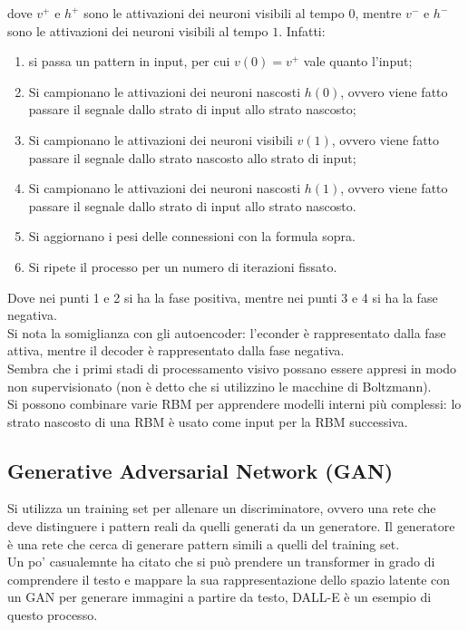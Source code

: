 dove $v^{+}$ e $h^{+}$ sono le attivazioni dei neuroni visibili al tempo $0$,
mentre $v^{-}$ e $h^{-}$ sono le attivazioni dei neuroni visibili al tempo
$1$. Infatti:
\begin{enumerate}
	\item si passa un pattern in input, per cui $v(0) = v^{+}$ vale quanto
		l'input; 

	\item Si campionano le attivazioni dei neuroni nascosti $h(0)$, ovvero viene
	fatto passare il segnale dallo strato di input allo strato nascosto;

	\item Si campionano le attivazioni dei neuroni visibili $v(1)$, ovvero viene
	fatto passare il segnale dallo strato nascosto allo strato di input;

	\item Si campionano le attivazioni dei neuroni nascosti $h(1)$, ovvero viene
	fatto passare il segnale dallo strato di input allo strato nascosto.

	\item Si aggiornano i pesi delle connessioni con la formula sopra.

	\item Si ripete il processo per un numero di iterazioni fissato.
\end{enumerate}

Dove nei punti 1 e 2 si ha la fase positiva, mentre nei punti 3 e 4 si ha la
fase negativa.\\
Si nota la somiglianza con gli autoencoder: l'econder è rappresentato dalla fase
attiva, mentre il decoder è rappresentato dalla fase negativa.\\
Sembra che i primi stadi di processamento visivo possano essere appresi in modo
non supervisionato (non è detto che si utilizzino le macchine di Boltzmann).\\

Si possono combinare varie RBM per apprendere modelli interni più complessi: lo
strato nascosto di una RBM è usato come input per la RBM successiva.

\subsection{Generative Adversarial Network (GAN)}

Si utilizza un training set per allenare un discriminatore, ovvero una rete che
deve distinguere i pattern reali da quelli generati da un generatore. Il
generatore è una rete che cerca di generare pattern simili a quelli del training
set. \\
Un po' casualemnte ha citato che si può prendere un transformer in grado di
comprendere il testo e mappare la sua rappresentazione dello spazio latente con
un GAN per generare immagini a partire da testo, DALL-E è un esempio di questo
processo.


